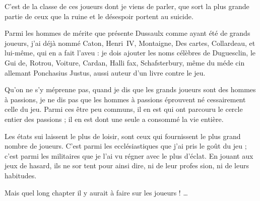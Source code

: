 C'est de la classe de ces joueurs dont
je viens de parler, que sort la plus
grande partie de ceux que la ruine et
le désespoir portent au suicide.

Parmi les hommes de mérite que
présente Dussaulx comme ayant été
de grands joueurs, j'ai déjà nommé
Caton, Henri~IV, Montaigne, Des%
cartes, Collardeau, et lui-même, qui
en a fait l'aveu : je dois ajouter les
noms célèbres de Duguesclin, le Gui%
de, Rotrou, Voiture, Cardan, Halli%
fax, Schafsterbury, même du méde%
cin allemant Ponchasius Justus, aussi
auteur d'un livre contre le jeu.

Qu'on ne s'y méprenne pas, quand
je dis que les grands joueurs sont des
hommes à passions, je ne dis pas que
les hommes à passions éprouvent né%
cessairement celle du jeu. Parmi ces
être peu communs, il en est qui ont
parcouru le cercle entier des passions ;
il en est dont une seule a consommé
la vie entière.

Les états sui laissent le plus de loisir,
sont ceux qui fournissent le plus grand
nombre de joueurs. C'est parmi les
ecclésiastiques que j'ai pris le goût du
jeu ; c'est parmi les militaires que je
l'ai vu régner avec le plus d'éclat. En
jouant aux jeux de hasard, ils ne sor%
tent pour ainsi dire, ni de leur profes%
sion, ni de leurs habitudes.

Mais quel long chapter il y aurait
à faire sur les joueurs ! …


